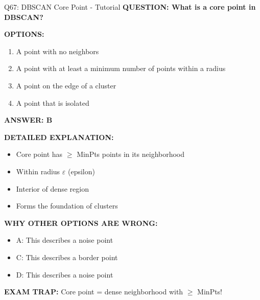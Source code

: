 \documentclass[8pt]{beamer}
\begin{document}
	\begin{frame}{Q67: DBSCAN Core Point - Tutorial}
		\fontsize{6.5}{7.5}\selectfont
		\textbf{QUESTION: What is a core point in DBSCAN?}
		
		\vspace{0.1cm}
		\textbf{OPTIONS:}
		\begin{enumerate}
			\item A point with no neighbors
			\item A point with at least a minimum number of points within a radius
			\item A point on the edge of a cluster
			\item A point that is isolated
		\end{enumerate}
		
		\vspace{0.1cm}
		\textcolor{myblue}{\textbf{ANSWER: B}}
		
		\vspace{0.1cm}
		\textbf{DETAILED EXPLANATION:}
		\begin{itemize}
			\item Core point has $\ge$ MinPts points in its neighborhood
			\item Within radius $\varepsilon$ (epsilon)
			\item Interior of dense region
			\item Forms the foundation of clusters
		\end{itemize}
		
		\vspace{0.1cm}
		\textcolor{myred}{\textbf{WHY OTHER OPTIONS ARE WRONG:}}
		\begin{itemize}
			\item \textcolor{myred}{A:} This describes a noise point
			\item \textcolor{myred}{C:} This describes a border point
			\item \textcolor{myred}{D:} This describes a noise point
		\end{itemize}
		
		\textcolor{myred}{\textbf{EXAM TRAP:}} Core point = \textcolor{myblue}{dense neighborhood} with $\ge$ MinPts!
	\end{frame}
	
\end{document}
